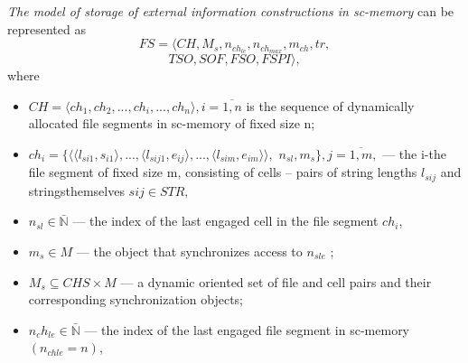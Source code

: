 \documentclass{scndocument}
\begin{document}
\begin{SCn}
\begin{multicols}{2}
\textit{The model of storage of external information constructions in sc-memory} can be represented as
\[  FS =\langle CH, M_s, n_{{ch}_{le}} , n_{{ch}_{max}}, m_{ch}, tr, \]
\[TSO, SOF, FSO, FSPI \rangle,\] 
where
\begin{itemize}
\item $CH = \langle ch_1, ch_2, ..., ch_i, ..., ch_n \rangle, i =\overline{ 1, n}$ is the sequence of dynamically allocated file segments in sc-memory of fixed size n;
\item  $ch_i = \{\langle\langle l_{si1},s_{i1}\rangle, ...,\langle l_{sij1}, e_{ij} \rangle, ...,\langle l_{sim}, e_{im}\rangle\rangle,$ $n_{sl}, m_s\},j = \overline{1, m},$ — the i-the file segment of fixed size m, consisting of cells – pairs of string lengths $l_{sij}$ and stringsthemselves $sij \in ST R,$
\item  $n_{sl} \in \bar{\mathbb{N}}$ — the index of the last engaged cell in the file segment $ch_i$,
\item $m_s \in M$ — the object that synchronizes access to $n_{sle}$ ;
\item$ M_s \subseteq CHS \times M$ — a dynamic oriented set of file
and cell pairs and their corresponding synchronization objects;
\item  $n_ch_{le} \in \bar{\mathbb{N}}$ — the index of the last engaged file segment in sc-memory $(n_{chle} = n)$,
\end{itemize}
\end{multicols}
\end{SCn}
\end{document}
